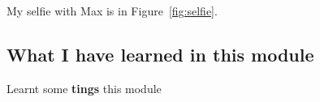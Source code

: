 
 My selfie with Max is in  Figure~\ref{fig:selfie}.

\subsection{What I have learned in this module}
Learnt some \textbf{tings} this module
